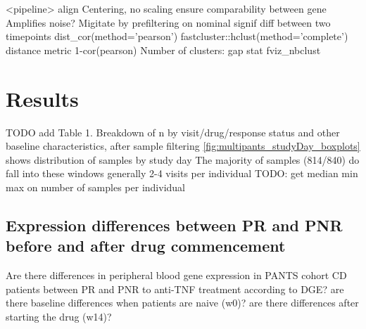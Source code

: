\begin{outline}
\1 <pipeline>
    \2 align
    \2 Centering, no scaling
        \3 ensure comparability between gene
        \3 Amplifies noise? Migitate by prefiltering on nominal signif diff between two timepoints
    \2 dist\_cor(method='pearson')
    \2 fastcluster::hclust(method='complete')
    \2 distance metric 1-cor(pearson)
    \2 Number of clusters: gap stat fviz\_nbclust

\section{Results}


\1 TODO add Table 1. Breakdown of n by visit/drug/response status and other baseline characteristics, after sample filtering
    \2 \autoref{fig:multipants_studyDay_boxplots} shows distribution of samples by study day
    \2 The majority of samples (814/840) do fall into these windows
    \2 generally 2-4 visits per individual TODO: get median min max on number of samples per individual

\subsection{Expression differences between PR and PNR before and after drug commencement}

\1 Are there differences in peripheral blood gene expression in PANTS cohort CD patients between PR and PNR to anti-TNF treatment according to DGE?
    \2 are there baseline differences when patients are naive (w0)?
    \2 are there differences after starting the drug (w14)?


\end{outline}
